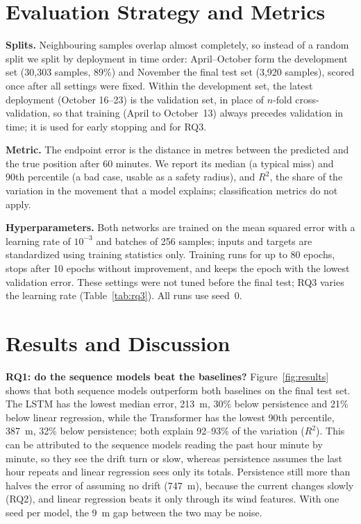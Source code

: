 \documentclass[sigconf]{acmart}
\begin{document}
\section{Evaluation Strategy and Metrics}

\textbf{Splits.} Neighbouring samples overlap almost completely, so instead of a random split we split by deployment in time order: April--October form the development set (30{,}303 samples, 89\%) and November the final test set (3{,}920 samples), scored once after all settings were fixed. Within the development set, the latest deployment (October 16--23) is the validation set, in place of $n$-fold cross-validation, so that training (April to October~13) always precedes validation in time; it is used for early stopping and for RQ3.

\textbf{Metric.} The endpoint error is the distance in metres between the predicted and the true position after 60 minutes. We report its median (a typical miss) and 90th percentile (a bad case, usable as a safety radius), and $R^2$, the share of the variation in the movement that a model explains; classification metrics do not apply.

\textbf{Hyperparameters.}
Both networks are trained on the mean squared error with a learning rate of $10^{-3}$ and batches of 256 samples; inputs and targets are standardized using training statistics only. Training runs for up to 80 epochs, stops after 10 epochs without improvement, and keeps the epoch with the lowest validation error. These settings were not tuned before the final test; RQ3 varies the learning rate (Table~\ref{tab:rq3}). All runs use seed~0.


\section{Results and Discussion}


\textbf{RQ1: do the sequence models beat the baselines?} Figure~\ref{fig:results} shows that both sequence models outperform both baselines on the final test set. The LSTM has the lowest median error, 213~m, 30\% below persistence and 21\% below linear regression, while the Transformer has the lowest 90th percentile, 387~m, 32\% below persistence; both explain 92--93\% of the variation ($R^2$). This can be attributed to the sequence models reading the past hour minute by minute, so they see the drift turn or slow, whereas persistence assumes the last hour repeats and linear regression sees only its totals. Persistence still more than halves the error of assuming no drift (747~m), because the current changes slowly (RQ2), and linear regression beats it only through its wind features. With one seed per model, the 9~m gap between the two may be noise.
\end{document}
